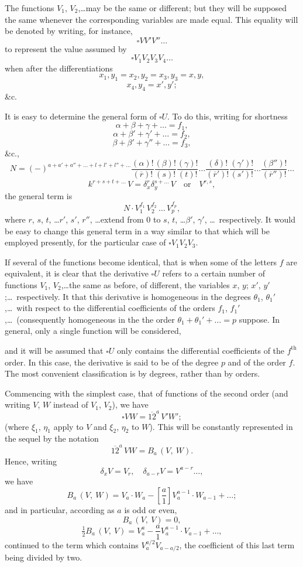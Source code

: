 \documentclass[11pt,a4paper]{article}
\theoremstyle{plain}
\theoremstyle{definition}
\theoremstyle{remark}
\begin{document}
\newpage

The functions $V_1$, $V_2$,\ldots may be the same or different; but they will be supposed the
same whenever the corresponding variables are made equal. This equality will be
denoted by writing, for instance,
\[
\square V V' V''\ldots
\]
to represent the value assumed by
\[
\square V_1V_2V_3V_4\ldots
\]
when after the differentiations
\[
x_1, y_1 = x_2, y_2 = x_3, y_3 = x, y,
\]
\[
x_4, y_4 = x', y';
\]
\&c.

It is easy to determine the general form of $\square U$. To do this, writing for shortness
\[
\alpha + \beta + \gamma + \ldots = f_1,
\]
\[
\alpha + \beta' + \gamma' + \ldots = f_2,
\]
\[
\beta + \beta' + \gamma'' + \ldots = f_3,
\]
\&c.,
\[
N = (-)^{a+a'+a''+\ldots+l+l'+l''+\ldots}
\frac{(\alpha)!}{(\overline{r})!}
\frac{(\beta)!}{(s)!}
\frac{(\gamma)!}{(t)!}\ldots
\frac{(\delta)!}{(\overline{r}')!}
\frac{(\gamma')!}{(s')!}\ldots
\frac{(\beta'')!}{(\overline{r}'')!}\ldots
\]
\[
k^{r+s+t+\ldots}\,V = \delta_x^r\delta_y^{s+\ldots}\,V \quad\text{or}\quad V^{r,s},
\]
the general term is
\[
N \cdot V_1^{f_1}\,V_2^{f_2}\,\ldots\,V_p^{f_p},
\]
where $r$, $s$, $t$, \ldots $r'$, $s'$, $r''$, \ldots extend from 0 to $s$, $t$, \ldots $\beta'$, $\gamma'$, \ldots\ respectively. It
would be easy to change this general term in a way similar to that which will be
employed presently, for the particular case of $\square V_1V_2V_3$.

If several of the functions become identical, that is when some of the letters
$f$ are equivalent, it is clear that the derivative $\square U$ refers to a certain number of
functions $V_1$, $V_2$,\ldots the same as before, of different, the variables $x$, $y$; $x'$, $y'$;\ldots\ respectively. It
that this derivative is homogeneous in the degrees $\theta_1$, $\theta_1'$,\ldots\ with respect to the
differential coefficients of the orders $f_1$, $f_1'$,\ldots\ (consequently homogeneous in the
the order $\theta_1+\theta_1'+\ldots=p$ suppose. In general, only a single function will be considered,

\newpage

and it will be assumed that $\square U$ only contains the differential coefficients of the
$f^{\text{th}}$ order. In this case, the derivative is said to be of the degree $p$ and of the
order $f$. The most convenient classification is by degrees, rather than by orders.

Commencing with the simplest case, that of functions of the second order (and
writing $V$, $W$ instead of $V_1$, $V_2$), we have
\[
\square VW = \overline{12}^a\,V'W';
\]
(where $\xi_1$, $\eta_1$ apply to $V$ and $\xi_2$, $\eta_2$ to $W$). This will be constantly represented in
the sequel by the notation
\[
\overline{12}^a\,VW = B_a\,(V,\ W).
\]
Hence, writing
\[
\delta_x V = V_r,\quad \delta_{a-r}V = V^{a-r}\ldots,
\]
we have
\[
B_a\,(V,\ W) = V_a\cdot W_a - \left[\frac{a}{1}\right]V_a^{a-1}\cdot W_{a-1} + \ldots;
\]
and in particular, according as $a$ is odd or even,
\[
B_a\,(V,\ V) = 0,
\]
\[
\tfrac{1}{2}B_a\,(V,\ V) = V_a^a - \frac{a}{1}V_a^{a-1}\cdot V_{a-1} + \ldots,
\]
continued to the term which contains $V_a^{a/2}V_{a-a/2}$, the coefficient of this last term
being divided by two.
\end{document}
